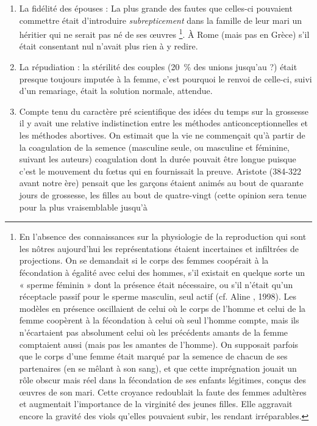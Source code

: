 \begin{enumerate}
\item La fidélité des épouses : La plus grande des fautes que celles-ci
pouvaient commettre était d'introduire \emph{subrepticement} dans la famille de
leur mari un héritier qui ne serait pas né de ses œuvres%
\footnote{En l'absence des connaissances sur la physiologie de la reproduction qui sont les nôtres aujourd'hui les représentations étaient incertaines et infiltrées de projections. On se demandait si le corps des femmes coopérait à la 
fécondation à égalité avec celui des hommes, s'il existait en quelque sorte un « sperme féminin » dont la présence 
était nécessaire, ou s'il n'était qu'un réceptacle passif pour le sperme masculin, seul actif (cf. Aline , 
1998). Les modèles en présence oscillaient de celui où le corps de l'homme et celui de la femme coopèrent à la fécondation à celui où seul l'homme compte, mais ils n'écartaient pas absolument celui où les précédents amants de 
la femme comptaient aussi (mais pas les amantes de l'homme). On supposait parfois que le corps d'une femme 
était marqué par la semence de chacun de ses partenaires (en se mêlant à son sang), et que cette imprégnation jouait
un rôle obscur mais réel
dans la fécondation de ses
enfants légitimes,
conçus des œuvres
de son mari. Cette 
croyance redoublait la faute des femmes adultères et augmentait l'importance de la virginité des jeunes filles. Elle 
aggravait encore la gravité des viols qu'elles pouvaient subir, les rendant irréparables.}.
À Rome (mais pas en Grèce) s'il était consentant nul n'avait plus rien à y redire.
\item La répudiation : la stérilité des couples (20~\% des unions jusqu'au
 ?) était presque toujours imputée à la femme, c'est
pourquoi le renvoi de celle-ci, suivi d'un remariage, était la solution normale,
attendue.
\item Compte tenu du caractère pré scientifique des idées du temps
sur la grossesse il y avait une relative indistinction entre les méthodes anticonceptionnelles
et les méthodes abortives. On estimait que la vie ne
commençait qu'à partir de la coagulation de la semence (masculine seule,
ou masculine et féminine, suivant les auteurs) coagulation dont la durée
pouvait être longue puisque c'est le mouvement du fœtus qui en fournissait
la preuve. Aristote (384-322 avant notre ère) pensait que les garçons
étaient animés au bout de quarante jours de grossesse, les filles au bout
de quatre-vingt (cette opinion sera tenue pour la plus vraisemblable jusqu'à

\end{enumerate}
